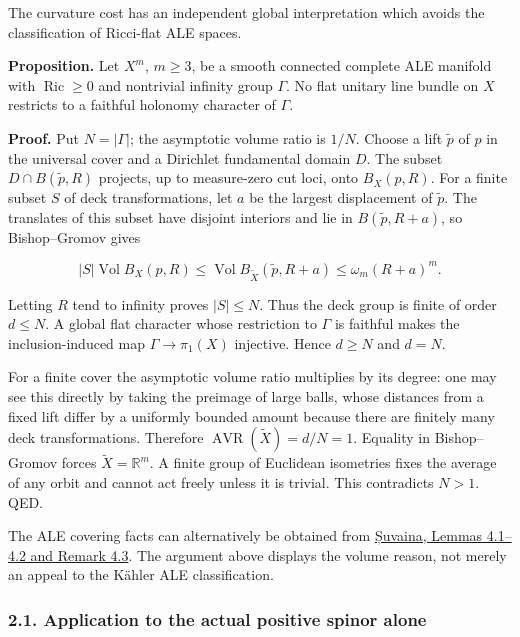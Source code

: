\documentclass[
  10pt,
]{article}
\begin{document}
The curvature cost has an independent global interpretation which avoids
the classification of Ricci-flat ALE spaces.

\textbf{Proposition.} Let \(X^m\), \(m\ge3\), be a smooth connected
complete ALE manifold with \(\operatorname{Ric}\ge0\) and nontrivial
infinity group \(\Gamma\). No flat unitary line bundle on \(X\)
restricts to a faithful holonomy character of \(\Gamma\).

\textbf{Proof.} Put \(N=|\Gamma|\); the asymptotic volume ratio is
\(1/N\). Choose a lift \(\tilde p\) of \(p\) in the universal cover and
a Dirichlet fundamental domain \(D\). The subset \(D\cap B(\tilde p,R)\)
projects, up to measure-zero cut loci, onto \(B_X(p,R)\). For a finite
subset \(S\) of deck transformations, let \(a\) be the largest
displacement of \(\tilde p\). The translates of this subset have
disjoint interiors and lie in \(B(\tilde p,R+a)\), so Bishop--Gromov
gives

\[
 |S|\operatorname{Vol}B_X(p,R)
     \le\operatorname{Vol}B_{\widetilde X}(\tilde p,R+a)
     \le\omega_m(R+a)^m.
\]

Letting \(R\) tend to infinity proves \(|S|\le N\). Thus the deck group
is finite of order \(d\le N\). A global flat character whose restriction
to \(\Gamma\) is faithful makes the inclusion-induced map
\(\Gamma\to\pi_1(X)\) injective. Hence \(d\ge N\) and \(d=N\).

For a finite cover the asymptotic volume ratio multiplies by its degree:
one may see this directly by taking the preimage of large balls, whose
distances from a fixed lift differ by a uniformly bounded amount because
there are finitely many deck transformations. Therefore
\(\operatorname{AVR}(\widetilde X)=d/N=1\). Equality in Bishop--Gromov
forces \(\widetilde X=\mathbb R^m\). A finite group of Euclidean
isometries fixes the average of any orbit and cannot act freely unless
it is trivial. This contradicts \(N>1\). QED.

The ALE covering facts can alternatively be obtained from
\href{https://arxiv.org/pdf/1102.2672}{Șuvaina, Lemmas 4.1--4.2 and
Remark 4.3}. The argument above displays the volume reason, not merely
an appeal to the Kähler ALE classification.

\hypertarget{application-to-the-actual-positive-spinor-alone}{%
\subsubsection{2.1. Application to the actual positive spinor
alone}\label{application-to-the-actual-positive-spinor-alone}}
\end{document}
